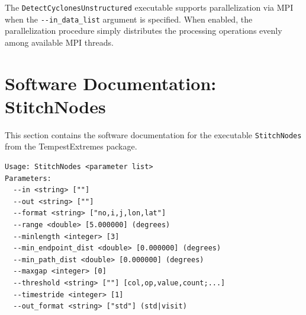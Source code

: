 \documentclass[gmdd, hvmath]{copernicus}
\begin{document}
The \texttt{DetectCyclonesUnstructured} executable supports parallelization via MPI when the \texttt{-\;\!\!-in\_data\_list} argument is specified.  When enabled, the parallelization procedure simply distributes the processing operations evenly among available MPI threads.

\section{Software Documentation: StitchNodes} \label{sec:StitchNodesAppendix}

This section contains the software documentation for the executable \texttt{StitchNodes} from the TempestExtremes package.

{\small
\begin{verbatim}
Usage: StitchNodes <parameter list>
Parameters:
  --in <string> [""] 
  --out <string> [""] 
  --format <string> ["no,i,j,lon,lat"] 
  --range <double> [5.000000] (degrees)
  --minlength <integer> [3] 
  --min_endpoint_dist <double> [0.000000] (degrees)
  --min_path_dist <double> [0.000000] (degrees)
  --maxgap <integer> [0] 
  --threshold <string> [""] [col,op,value,count;...]
  --timestride <integer> [1] 
  --out_format <string> ["std"] (std|visit)
\end{verbatim}
}
\end{document}
